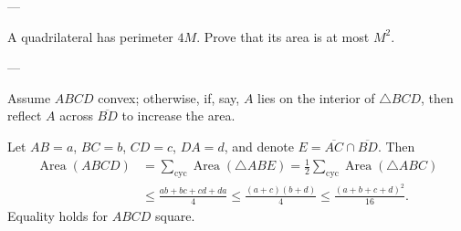 
---

A quadrilateral has perimeter $4M$. Prove that its area is at most $M^2$.

---

Assume $ABCD$ convex; otherwise, if, say, $A$ lies on the interior of $\triangle BCD$, then reflect $A$ across $\overline{BD}$ to increase the area.

Let $AB=a$, $BC=b$, $CD=c$, $DA=d$, and denote $E=\overline{AC}\cap\overline{BD}$. Then
\begin{align*}
\operatorname{Area}(ABCD)&=\sum_\mathrm{cyc}\operatorname{Area}(\triangle ABE)=\frac12\sum_\mathrm{cyc}\operatorname{Area}(\triangle ABC)\\
&\le\frac{ab+bc+cd+da}4\le\frac{(a+c)(b+d)}4\le\frac{(a+b+c+d)^2}{16}.
\end{align*}
Equality holds for $ABCD$ square.
